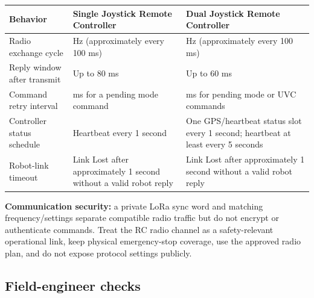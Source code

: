 \documentclass[
  10pt,
  letterpaper,
  openany]{report}
\newcounter{none} %
\begin{document}
{\def\LTcaptype{none} %
\begin{longtable}[]{@{}
  >{\raggedright\arraybackslash}p{}
  >{\raggedright\arraybackslash}p{}
  >{\raggedright\arraybackslash}p{}@{}}
\toprule\noalign{}
\begin{minipage}[b]{\linewidth}\raggedright
Behavior
\end{minipage} & \begin{minipage}[b]{\linewidth}\raggedright
Single Joystick Remote Controller
\end{minipage} & \begin{minipage}[b]{\linewidth}\raggedright
Dual Joystick Remote Controller
\end{minipage} \\
\midrule\noalign{}
\endhead
\bottomrule\noalign{}
\endlastfoot
Radio exchange cycle & 10 Hz (approximately every 100 ms) & 10 Hz
(approximately every 100 ms) \\
Reply window after transmit & Up to 80 ms & Up to 60 ms \\
Command retry interval & 300 ms for a pending mode command & 300 ms for
pending mode or UVC commands \\
Controller status schedule & Heartbeat every 1 second & One
GPS/heartbeat status slot every 1 second; heartbeat at least every 5
seconds \\
Robot-link timeout & Link Lost after approximately 1 second without a
valid robot reply & Link Lost after approximately 1 second without a
valid robot reply \\
\end{longtable}
}

\begin{manualwarning}

\textbf{Communication security:} a private LoRa sync word and matching
frequency/settings separate compatible radio traffic but do not encrypt
or authenticate commands. Treat the RC radio channel as a
safety-relevant operational link, keep physical emergency-stop coverage,
use the approved radio plan, and do not expose protocol settings
publicly.

\end{manualwarning}

\subsection{Field-engineer checks}\label{field-engineer-checks}
\end{document}
